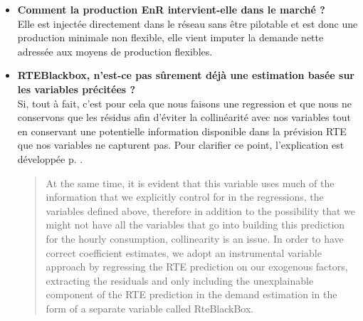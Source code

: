 \documentclass{article}
\begin{document}
\begin{itemize}
\item \textbf{Comment la production EnR intervient-elle dans le marché ? }\\

Elle est injectée directement dans le réseau sans être pilotable et est donc une production minimale non flexible, elle vient imputer la demande nette adressée aux moyens de production flexibles.

\item \textbf{RTEBlackbox, n'est-ce pas sûrement déjà une estimation basée sur les variables précitées ?}\\

Si, tout à fait, c'est pour cela que nous faisons une regression et que nous ne conservons que les résidus afin d'éviter la collinéarité avec nos variables tout en conservant une potentielle information disponible dans la prévision RTE que nos variables ne capturent pas. Pour clarifier ce point, l'explication est développée p. \pageref{RteBlackBox}. 

\begin{quote}
At the same time, it is evident that this variable uses much of the information that we explicitly control for in the regressions, the variables defined above, therefore in addition to the possibility that we might not have all the variables that go into building this prediction for the hourly consumption, collinearity is an issue. In order to have correct coefficient estimates, we adopt an instrumental variable approach by regressing the RTE prediction on our exogenous factors, extracting the residuals and only including the unexplainable component of the RTE prediction in the demand estimation in the form of a separate variable called RteBlackBox.
\end{quote}
\end{itemize}
\end{document}
